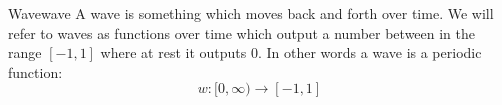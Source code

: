 \begin{definition}{Wave}{wave}
  A wave is something which moves back and forth over time. We will refer to
  waves as functions over time which output a number between in the range $
  \left[ -1,1 \right]$ where at rest it outputs $ 0$. In other words a wave is a
  periodic function: 
  \[
   w : [0, \infty) \to \left[ -1,1 \right] 
  \]
\end{definition}



